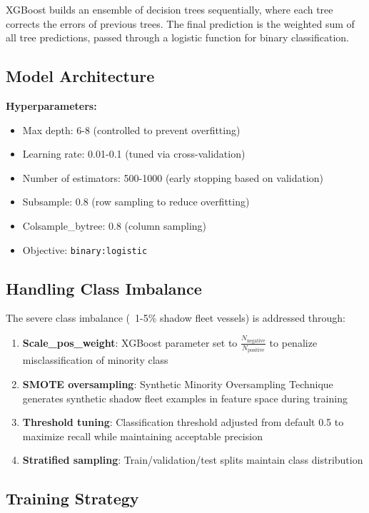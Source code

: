 XGBoost builds an ensemble of decision trees sequentially, where each tree corrects the errors of previous trees. The final prediction is the weighted sum of all tree predictions, passed through a logistic function for binary classification.

\subsection{Model Architecture}

\textbf{Hyperparameters:}
\begin{itemize}
    \item Max depth: 6-8 (controlled to prevent overfitting)
    \item Learning rate: 0.01-0.1 (tuned via cross-validation)
    \item Number of estimators: 500-1000 (early stopping based on validation)
    \item Subsample: 0.8 (row sampling to reduce overfitting)
    \item Colsample\_bytree: 0.8 (column sampling)
    \item Objective: \texttt{binary:logistic}
\end{itemize}

\subsection{Handling Class Imbalance}
The severe class imbalance (~1-5\% shadow fleet vessels) is addressed through:

\begin{enumerate}
    \item \textbf{Scale\_pos\_weight}: XGBoost parameter set to $\frac{N_{\text{negative}}}{N_{\text{positive}}}$ to penalize misclassification of minority class
    \item \textbf{SMOTE oversampling}: Synthetic Minority Oversampling Technique generates synthetic shadow fleet examples in feature space during training
    \item \textbf{Threshold tuning}: Classification threshold adjusted from default 0.5 to maximize recall while maintaining acceptable precision
    \item \textbf{Stratified sampling}: Train/validation/test splits maintain class distribution
\end{enumerate}

\subsection{Training Strategy}

